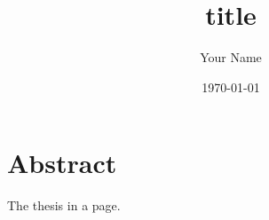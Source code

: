 \documentclass[12pt,oneside]{book}
\title{{{title}}}
\author{Your Name}
\date{\today}
\begin{document}
\frontmatter
\maketitle

\chapter*{Abstract}
The thesis in a page.

\tableofcontents

\mainmatter




\backmatter


\end{document}
